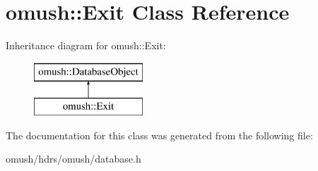 \hypertarget{classomush_1_1_exit}{\section{omush\-:\-:Exit Class Reference}
\label{classomush_1_1_exit}
}
Inheritance diagram for omush\-:\-:Exit\-:\begin{figure}[H]
\begin{center}
\leavevmode
\includegraphics[height=2.000000cm]{classomush_1_1_exit}
\end{center}
\end{figure}


The documentation for this class was generated from the following file\-:\begin{DoxyCompactItemize}
\item 
omush/hdrs/omush/database.\-h\end{DoxyCompactItemize}
